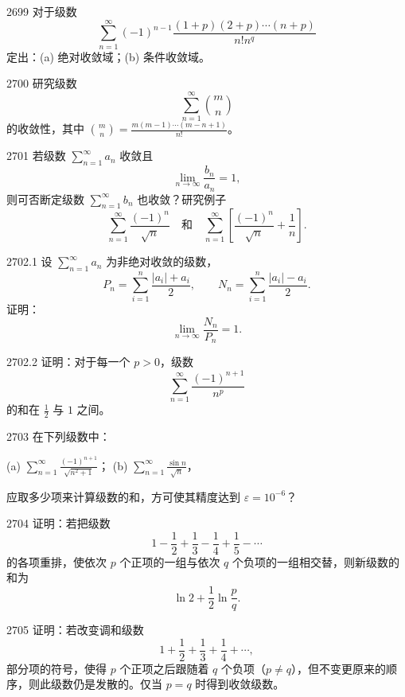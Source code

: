 \begin{prob}[M]{2699}
对于级数
\[\sum_{n=1}^{\infty} (-1)^{n-1} \frac{(1+p)(2+p)\cdots(n+p)}{n! n^q}\]
定出：(a) 绝对收敛域；(b) 条件收敛域。
\end{prob}

\begin{prob}[M]{2700}
研究级数
\[\sum_{n=1}^{\infty} \binom{m}{n}\]
的收敛性，其中 $\binom{m}{n} = \frac{m(m-1)\cdots(m-n+1)}{n!}$。
\end{prob}

\begin{prob}[M]{2701}
若级数 $\sum_{n=1}^{\infty} a_n$ 收敛且
\[\lim_{n \to \infty} \frac{b_n}{a_n} = 1,\]
则可否断定级数 $\sum_{n=1}^{\infty} b_n$ 也收敛？研究例子
\[\sum_{n=1}^{\infty} \frac{(-1)^n}{\sqrt{n}} \quad \text{和} \quad \sum_{n=1}^{\infty} \left[\frac{(-1)^n}{\sqrt{n}} + \frac{1}{n}\right].\]
\end{prob}

\begin{prob}[M]{2702.1}
设 $\sum_{n=1}^{\infty} a_n$ 为非绝对收敛的级数，
\[P_n = \sum_{i=1}^{n} \frac{|a_i| + a_i}{2}, \qquad N_n = \sum_{i=1}^{n} \frac{|a_i| - a_i}{2}.\]
证明：
\[\lim_{n \to \infty} \frac{N_n}{P_n} = 1.\]
\end{prob}

\begin{prob}[M]{2702.2}
证明：对于每一个 $p > 0$，级数
\[\sum_{n=1}^{\infty} \frac{(-1)^{n+1}}{n^p}\]
的和在 $\frac{1}{2}$ 与 $1$ 之间。
\end{prob}

\begin{prob}[M]{2703}
在下列级数中：

(a) $\sum_{n=1}^{\infty} \frac{(-1)^{n+1}}{\sqrt{n^2 + 1}}$； \qquad (b) $\sum_{n=1}^{\infty} \frac{\sin n}{\sqrt{n}}$，

应取多少项来计算级数的和，方可使其精度达到 $\varepsilon = 10^{-6}$？
\end{prob}

\begin{prob}[M]{2704}
证明：若把级数
\[1 - \frac{1}{2} + \frac{1}{3} - \frac{1}{4} + \frac{1}{5} - \cdots\]
的各项重排，使依次 $p$ 个正项的一组与依次 $q$ 个负项的一组相交替，则新级数的和为
\[\ln 2 + \frac{1}{2} \ln \frac{p}{q}.\]
\end{prob}

\begin{prob}[M]{2705}
证明：若改变调和级数
\[1 + \frac{1}{2} + \frac{1}{3} + \frac{1}{4} + \cdots,\]
部分项的符号，使得 $p$ 个正项之后跟随着 $q$ 个负项（$p \neq q$），但不变更原来的顺序，则此级数仍是发散的。仅当 $p = q$ 时得到收敛级数。
\end{prob}

